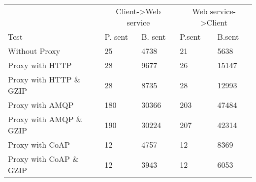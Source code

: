 \begin{tabularx}{\textwidth}{lXXXX}
\hline
\multicolumn{1}{l}{}                  & \multicolumn{2}{c}{Client->Web service}                           & \multicolumn{2}{c}{Web service->Client}                           \\
\multicolumn{1}{l}{Test} & \multicolumn{1}{l}{P. sent} & \multicolumn{1}{l}{B. sent} & \multicolumn{1}{l}{P.sent} & \multicolumn{1}{l}{B.sent} \\ \hline
Without Proxy                   & 25             & 4738           & 21             & 5638           \\
Proxy with HTTP                 & 28             & 9677           & 26             & 15147          \\
Proxy with HTTP \& GZIP         & 28             & 8735           & 28             & 12993          \\
Proxy with AMQP                 & 180            & 30366          & 203            & 47484          \\
Proxy with AMQP \& GZIP         & 190            & 30224          & 207            & 42314          \\
Proxy with CoAP                 & 12             & 4757           & 12             & 8369           \\
Proxy with CoAP \& GZIP         & 12             & 3943           & 12             & 6053           \\
\end{tabularx}
